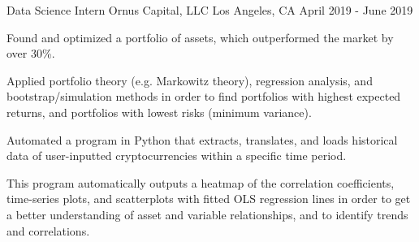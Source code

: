 \begin{cventries}
  \cventry
    {Data Science Intern} %
    {Ornus Capital, LLC} %
    {Los Angeles, CA} %
    {April 2019 - June 2019} %
    {
      \begin{cvitems} %
        \item {Found and optimized a portfolio of assets, which outperformed the market by over 30\%.}
        \vspace{4mm}
        \begin{cvitems}
        	\item {Applied portfolio theory (e.g. Markowitz theory), regression analysis, and bootstrap/simulation methods in order to find portfolios with highest expected returns, and portfolios with lowest risks (minimum variance).}
        \end{cvitems}
   		\vspace{4mm}
        \item {Automated a program in Python that extracts, translates, and loads historical data of user-inputted cryptocurrencies within a specific time period.}
        \vspace{4mm}
        \begin{cvitems}
        	\item {This program automatically outputs a heatmap of the correlation coefficients, time-series plots, and scatterplots with fitted OLS regression lines in order to get a better understanding of asset and variable relationships, and to identify trends and correlations.}
        \end{cvitems}
    	\vspace{4mm}	
      \end{cvitems}
    }


\end{cventries}
